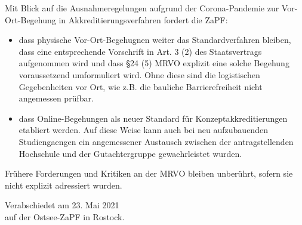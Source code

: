 \documentclass[DIV=calc]{scrartcl}
\begin{document}
Mit Blick auf die Ausnahmeregelungen aufgrund der Corona-Pandemie zur Vor-Ort-Begehung in Akkreditierungsverfahren fordert die ZaPF:

\begin{itemize}
	\item dass physische Vor-Ort-Begehugnen weiter das Standardverfahren bleiben, dass eine entsprechende Vorschrift in Art. 3 (2) des Staatsvertrags aufgenommen wird und dass §24 (5) MRVO explizit eine solche Begehung voraussetzend umformuliert wird. Ohne diese sind die logistischen Gegebenheiten vor Ort, wie z.B. die bauliche Barrierefreiheit nicht angemessen prüfbar. 
	
	\item dass Online-Begehungen als neuer Standard für Konzeptakkreditierungen etabliert werden. Auf diese Weise kann auch bei neu aufzubauenden Studiengaengen ein angemessener Austausch zwischen der antragstellenden Hochschule und der Gutachtergruppe gewaehrleistet wurden.
\end{itemize}

Frühere Forderungen und Kritiken an der MRVO bleiben unberührt, sofern sie nicht explizit adressiert wurden.
\vspace{1cm} 

\vfill
\begin{flushright}
	Verabschiedet am 23. Mai 2021 \\
	auf der Ostsee-ZaPF in Rostock.
\end{flushright}
\end{document}

